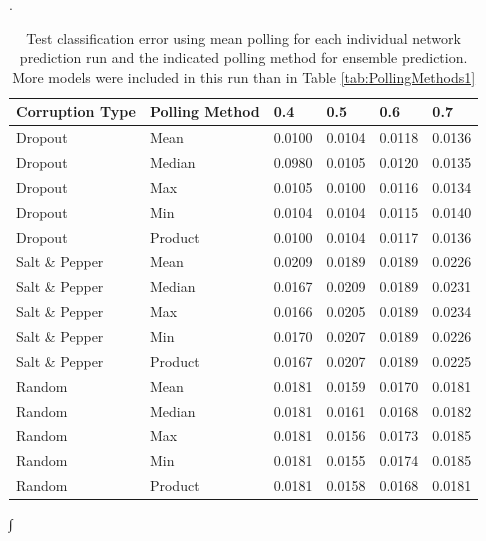 \documentclass{article} %
\begin{document}
\begin{table}[ht]
\caption{Test classification error using mean polling for each individual network prediction run and the indicated polling method for ensemble prediction. More models were included in this run than in Table \ref{tab:PollingMethods1}}.
\label{tab:PollingMethods2}
\begin{center}
\begin{tabular}{| l |  l  ||| l | l | l | l |}
\hline
Corruption Type & Polling Method & 0.4 & 0.5 & 0.6 & 0.7\\
\hline
\hline
Dropout & Mean & 0.0100 & 0.0104 & 0.0118 & 0.0136 \\
\hline
Dropout & Median & 0.0980 & 0.0105 & 0.0120 & 0.0135 \\
\hline
Dropout & Max & 0.0105 & 0.0100 & 0.0116 & 0.0134 \\
\hline
Dropout & Min & 0.0104 & 0.0104 & 0.0115 & 0.0140 \\
\hline
Dropout & Product & 0.0100 & 0.0104 & 0.0117 & 0.0136 \\
\hline
\hline
Salt \& Pepper & Mean & 0.0209 & 0.0189 & 0.0189 & 0.0226 \\
\hline
Salt \& Pepper & Median & 0.0167 & 0.0209 & 0.0189 & 0.0231\\
\hline
Salt \& Pepper & Max & 0.0166 & 0.0205 & 0.0189 & 0.0234 \\
\hline
Salt \& Pepper & Min & 0.0170 & 0.0207 & 0.0189 & 0.0226 \\
\hline
Salt \& Pepper & Product & 0.0167 & 0.0207 & 0.0189 & 0.0225 \\
\hline
\hline
Random & Mean & 0.0181 & 0.0159 & 0.0170 & 0.0181 \\
\hline
Random & Median & 0.0181 & 0.0161 & 0.0168 & 0.0182 \\
\hline
Random & Max & 0.0181 & 0.0156 & 0.0173 & 0.0185 \\
\hline
Random & Min & 0.0181 & 0.0155 & 0.0174 & 0.0185 \\
\hline
Random & Product & 0.0181 & 0.0158 & 0.0168 & 0.0181 \\
\hline
\end{tabular}∫
\end{center}
\end{table}
\end{document}
